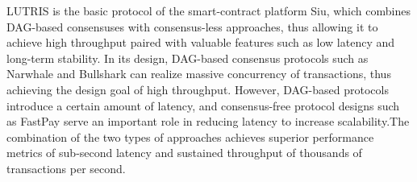 LUTRIS\cite{blackshear2023sui} is the basic protocol of the smart-contract platform Siu, which combines DAG-based consensuses with consensus-less approaches, thus allowing it to achieve high throughput paired with valuable features such as low latency and long-term stability. 
In its design, DAG-based consensus protocols such as Narwhale\cite{danezis2022narwhal} and Bullshark\cite{spiegelman2022bullshark} can realize massive concurrency of transactions, thus achieving the design goal of high throughput. 
However, DAG-based protocols introduce a certain amount of latency, and consensus-free protocol designs such as FastPay\cite{baudet2020fastpay} serve an important role in reducing latency to increase scalability.The combination of the two types of approaches achieves superior performance metrics of sub-second latency and sustained throughput of thousands of transactions per second.

